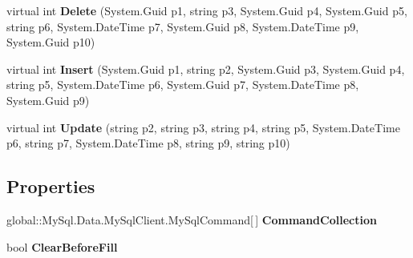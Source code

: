 \begin{DoxyCompactItemize}
\item 
virtual int {\bfseries Delete} (System.\+Guid p1, string p3, System.\+Guid p4, System.\+Guid p5, string p6, System.\+Date\+Time p7, System.\+Guid p8, System.\+Date\+Time p9, System.\+Guid p10)\hypertarget{class_products_1_1_data_1_1ds_sage_table_adapters_1_1ta_servicetermin_a26f1de55e44fa4c2310edc8b3488d8f9}{}\label{class_products_1_1_data_1_1ds_sage_table_adapters_1_1ta_servicetermin_a26f1de55e44fa4c2310edc8b3488d8f9}

\item 
virtual int {\bfseries Insert} (System.\+Guid p1, string p2, System.\+Guid p3, System.\+Guid p4, string p5, System.\+Date\+Time p6, System.\+Guid p7, System.\+Date\+Time p8, System.\+Guid p9)\hypertarget{class_products_1_1_data_1_1ds_sage_table_adapters_1_1ta_servicetermin_ace9fea85e09f89aa30471073ac3da23d}{}\label{class_products_1_1_data_1_1ds_sage_table_adapters_1_1ta_servicetermin_ace9fea85e09f89aa30471073ac3da23d}

\item 
virtual int {\bfseries Update} (string p2, string p3, string p4, string p5, System.\+Date\+Time p6, string p7, System.\+Date\+Time p8, string p9, string p10)\hypertarget{class_products_1_1_data_1_1ds_sage_table_adapters_1_1ta_servicetermin_a85ae39137f39ae53c47395afe7f9281d}{}\label{class_products_1_1_data_1_1ds_sage_table_adapters_1_1ta_servicetermin_a85ae39137f39ae53c47395afe7f9281d}

\end{DoxyCompactItemize}
\subsection*{Properties}
\begin{DoxyCompactItemize}
\item 
global\+::\+My\+Sql.\+Data.\+My\+Sql\+Client.\+My\+Sql\+Command\mbox{[}$\,$\mbox{]} {\bfseries Command\+Collection}\hypertarget{class_products_1_1_data_1_1ds_sage_table_adapters_1_1ta_servicetermin_acf7975fa16cc5b06d5f81a90de94f036}{}\label{class_products_1_1_data_1_1ds_sage_table_adapters_1_1ta_servicetermin_acf7975fa16cc5b06d5f81a90de94f036}

\item 
bool {\bfseries Clear\+Before\+Fill}\hypertarget{class_products_1_1_data_1_1ds_sage_table_adapters_1_1ta_servicetermin_a7f487b55d08c53df117afba625039220}{}\label{class_products_1_1_data_1_1ds_sage_table_adapters_1_1ta_servicetermin_a7f487b55d08c53df117afba625039220}

\end{DoxyCompactItemize}


